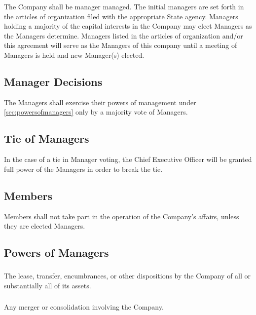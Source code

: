 \documentclass[11pt,onecolumn]{article}
\begin{document}
The Company shall be manager managed. The initial managers are set forth in the articles of organization filed with the appropriate State agency. Managers holding a majority of the capital interests in the Company may elect Managers as the Managers determine. Managers listed in the articles of organization and/or this agreement will serve as the Managers of this company until a meeting of Managers is held and new Manager(s) elected.

\subsection{Manager Decisions}

The Managers shall exercise their powers of management under \autoref{sec:powersofmanagers} only by a majority vote of Managers.

\subsection{Tie of Managers}

In the case of a tie in Manager voting, the Chief Executive Officer will be granted full power of the Managers in order to break the tie.

\subsection{Members}

Members shall not take part in the operation of the Company's affairs, unless they are elected Managers.

\subsection{Powers of Managers} \label{sec:powersofmanagers}

\subsubsection{}

The lease, transfer, encumbrances, or other dispositions by the Company of all or substantially all of its assets.

\subsubsection{}

Any merger or consolidation involving the Company.
\end{document}
